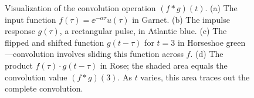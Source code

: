 \begin{figure}[htbp]
\caption{Visualization of the convolution operation $(f * g)(t)$. (a) The input function $f(\tau) = \ee^{-\alpha\tau}u(\tau)$ in Garnet. (b) The impulse response $g(\tau)$, a rectangular pulse, in Atlantic blue. (c) The flipped and shifted function $g(t-\tau)$ for $t=3$ in Horseshoe green---convolution involves sliding this function across $f$. (d) The product $f(\tau) \cdot g(t-\tau)$ in Rose; the shaded area equals the convolution value $(f*g)(3)$. As $t$ varies, this area traces out the complete convolution.}
\label{fig:convolution_visual}
\end{figure}
